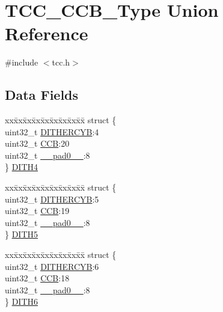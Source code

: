 \hypertarget{union_t_c_c___c_c_b___type}{}\section{T\+C\+C\+\_\+\+C\+C\+B\+\_\+\+Type Union Reference}
\label{union_t_c_c___c_c_b___type}


{\ttfamily \#include $<$tcc.\+h$>$}

\subsection*{Data Fields}
\begin{DoxyCompactItemize}
\item 
\begin{tabbing}
xx\=xx\=xx\=xx\=xx\=xx\=xx\=xx\=xx\=\kill
struct \{\\
\>uint32\_t \mbox{\hyperlink{union_t_c_c___c_c_b___type_a156fbeb3ca1ed9f6622afd99724ad24c}{DITHERCYB}}:4\\
\>uint32\_t \mbox{\hyperlink{union_t_c_c___c_c_b___type_a01afc958e04cff1d06806b323d21d694}{CCB}}:20\\
\>uint32\_t \mbox{\hyperlink{union_t_c_c___c_c_b___type_a3e57c2ef1c3ffb36722f000cc1156824}{\_\_pad0\_\_}}:8\\
\} \mbox{\hyperlink{union_t_c_c___c_c_b___type_adb6b982d5e34f35a1aae678e58da607d}{DITH4}}\\

\end{tabbing}\item 
\begin{tabbing}
xx\=xx\=xx\=xx\=xx\=xx\=xx\=xx\=xx\=\kill
struct \{\\
\>uint32\_t \mbox{\hyperlink{union_t_c_c___c_c_b___type_a156fbeb3ca1ed9f6622afd99724ad24c}{DITHERCYB}}:5\\
\>uint32\_t \mbox{\hyperlink{union_t_c_c___c_c_b___type_a01afc958e04cff1d06806b323d21d694}{CCB}}:19\\
\>uint32\_t \mbox{\hyperlink{union_t_c_c___c_c_b___type_a3e57c2ef1c3ffb36722f000cc1156824}{\_\_pad0\_\_}}:8\\
\} \mbox{\hyperlink{union_t_c_c___c_c_b___type_a197774fc5380a365f848e3ee1981005d}{DITH5}}\\

\end{tabbing}\item 
\begin{tabbing}
xx\=xx\=xx\=xx\=xx\=xx\=xx\=xx\=xx\=\kill
struct \{\\
\>uint32\_t \mbox{\hyperlink{union_t_c_c___c_c_b___type_a156fbeb3ca1ed9f6622afd99724ad24c}{DITHERCYB}}:6\\
\>uint32\_t \mbox{\hyperlink{union_t_c_c___c_c_b___type_a01afc958e04cff1d06806b323d21d694}{CCB}}:18\\
\>uint32\_t \mbox{\hyperlink{union_t_c_c___c_c_b___type_a3e57c2ef1c3ffb36722f000cc1156824}{\_\_pad0\_\_}}:8\\
\} \mbox{\hyperlink{union_t_c_c___c_c_b___type_a4803287c2ae16c5b0eb5315580563f13}{DITH6}}\\


\end{tabbing}
\end{DoxyCompactItemize}
